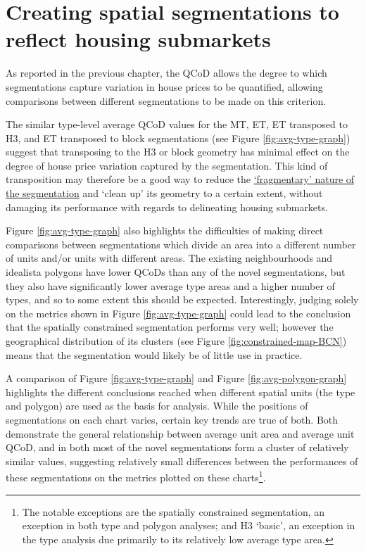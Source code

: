 \documentclass[a4paper, nobind]{templates/ociamthesis}
\begin{document}
\hypertarget{creating-spatial-segmentations-to-reflect-housing-submarkets}{%
\section{Creating spatial segmentations to reflect housing submarkets}\label{creating-spatial-segmentations-to-reflect-housing-submarkets}}

As reported in the previous chapter, the QCoD allows the degree to which segmentations capture variation in house prices to be quantified, allowing comparisons between different segmentations to be made on this criterion.

The similar type-level average QCoD values for the MT, ET, ET transposed to H3, and ET transposed to block segmentations (see Figure \ref{fig:avg-type-graph}) suggest that transposing to the H3 or block geometry has minimal effect on the degree of house price variation captured by the segmentation. This kind of transposition may therefore be a good way to reduce the \protect\hyperlink{fragmentary-segmentations}{`fragmentary' nature of the segmentation} and `clean up' its geometry to a certain extent, without damaging its performance with regards to delineating housing submarkets.

Figure \ref{fig:avg-type-graph} also highlights the difficulties of making direct comparisons between segmentations which divide an area into a different number of units and/or units with different areas. The existing neighbourhoods and idealista polygons have lower QCoDs than any of the novel segmentations, but they also have significantly lower average type areas and a higher number of types, and so to some extent this should be expected. Interestingly, judging solely on the metrics shown in Figure \ref{fig:avg-type-graph} could lead to the conclusion that the spatially constrained segmentation performs very well; however the geographical distribution of its clusters (see Figure \ref{fig:constrained-map-BCN}) means that the segmentation would likely be of little use in practice.

A comparison of Figure \ref{fig:avg-type-graph} and Figure \ref{fig:avg-polygon-graph} highlights the different conclusions reached when different spatial units (the type and polygon) are used as the basis for analysis. While the positions of segmentations on each chart varies, certain key trends are true of both. Both demonstrate the general relationship between average unit area and average unit QCoD, and in both most of the novel segmentations form a cluster of relatively similar values, suggesting relatively small differences between the performances of these segmentations on the metrics plotted on these charts\footnote{The notable exceptions are the spatially constrained segmentation, an exception in both type and polygon analyses; and H3 `basic', an exception in the type analysis due primarily to its relatively low average type area.}.
\end{document}
